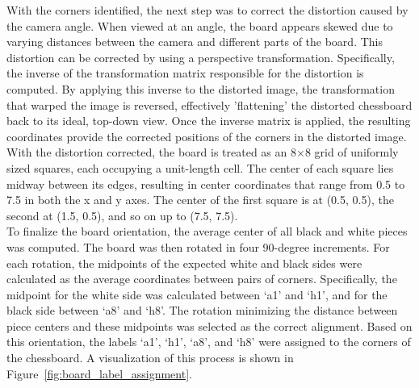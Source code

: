 With the corners identified, the next step was to correct the distortion caused by the camera angle. When viewed at an angle, the board appears skewed due to varying distances between the camera and different parts of the board. This distortion can be corrected by using a perspective transformation. Specifically, the inverse of the transformation matrix responsible for the distortion is computed. By applying this inverse to the distorted image, the transformation that warped the image is reversed, effectively 'flattening' the distorted chessboard back to its ideal, top-down view. Once the inverse matrix is applied, the resulting coordinates provide the corrected positions of the corners in the distorted image. \\

With the distortion corrected, the board is treated as an 8×8 grid of uniformly sized squares, each occupying a unit-length cell. The center of each square lies midway between its edges, resulting in center coordinates that range from 0.5 to 7.5 in both the x and y axes. The center of the first square is at (0.5, 0.5), the second at (1.5, 0.5), and so on up to (7.5, 7.5). \\

To finalize the board orientation, the average center of all black and white pieces was computed. The board was then rotated in four 90-degree increments. For each rotation, the midpoints of the expected white and black sides were calculated as the average coordinates between pairs of corners. Specifically, the midpoint for the white side was calculated between ‘a1’ and ‘h1’, and for the black side between ‘a8’ and ‘h8’. The rotation minimizing the distance between piece centers and these midpoints was selected as the correct alignment. Based on this orientation, the labels ‘a1’, ‘h1’, ‘a8’, and ‘h8’ were assigned to the corners of the chessboard. A visualization of this process is shown in Figure~\ref{fig:board_label_assignment}.
 

